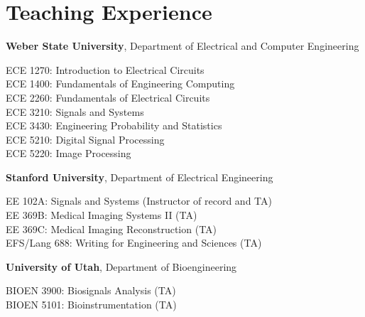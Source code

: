\section{\sc Teaching Experience}
%
\textbf{Weber State University}, Department of Electrical and Computer Engineering

ECE 1270: Introduction to Electrical Circuits \\ %
ECE 1400: Fundamentals of Engineering Computing \\ %
ECE 2260: Fundamentals of Electrical Circuits \\ %
ECE 3210: Signals and Systems \\ %
ECE 3430: Engineering Probability and Statistics\\
ECE 5210: Digital Signal Processing \\%
ECE 5220: Image Processing

%
\textbf{Stanford University}, Department of Electrical Engineering

EE 102A: Signals and Systems  (Instructor of record and TA) \\ %
EE 369B: Medical Imaging Systems II (TA) \\ %
EE 369C: Medical Imaging Reconstruction (TA) \\ %
EFS/Lang 688: Writing for Engineering and Sciences (TA) %

%
\textbf{University of Utah}, Department of Bioengineering

BIOEN 3900: Biosignals Analysis (TA) \\ %
BIOEN 5101: Bioinstrumentation (TA) %




